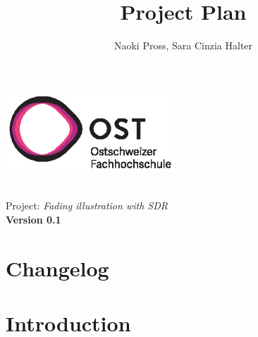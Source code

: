 \documentclass[a4paper, twosided, 11pt]{scrartcl}
\title{Project Plan}
\author{Naoki Pross, Sara Cinzia Halter}
\begin{document}
\begin{titlepage}
  \includegraphics[height=3cm]{fig/ost-logo}
  \begin{flushright}
    \vspace{5cm}
    {\Huge \bfseries \thetitle} \\
    \vspace{5mm}
    {\LARGE Project: \textit{Fading illustration with SDR}} \\
    \vspace{5mm}
    {\LARGE \bfseries Version 0.1}
  \end{flushright}
\end{titlepage}

\clearpage

\section{Changelog}
\section{Introduction}
\end{document}
